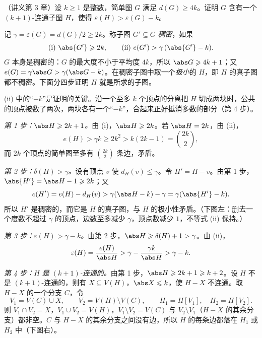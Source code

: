 \begin{workedexample}[问题 1]\label{we:yan-ch3-problems:mader}
（讲义第 3 章）设 $k\geqslant1$ 是整数，简单图 $G$ 满足 $d(G)\geqslant4k$。证明 $G$ 含有一个 $(k+1)$-连通子图 $H$，使得 $\varepsilon(H)>\varepsilon(G)-k$。
\end{workedexample}
\begin{solution}
记 $\gamma=\varepsilon(G)=d(G)/2\geqslant2k$。称子图 $G'\subseteq G$ \emph{稠密}，如果
\[
\text{(i)}\ \abs{G'}\geqslant2k,\qquad\text{(ii)}\ e(G')>\gamma\,(\abs{G'}-k).
\]
$G$ 本身是稠密的：$G$ 的最大度不小于平均度 $4k$，所以 $\abs G\geqslant4k+1$；又 $e(G)=\gamma\abs G>\gamma(\abs G-k)$。在稠密子图中取一个\emph{极小}的 $H$，即 $H$ 的真子图都不稠密。下面分四步证明 $H$ 就是所求的子图。

(ii) 中的“$-k$”是证明的关键。沿一个至多 $k$ 个顶点的分离把 $H$ 切成两块时，公共的顶点被数了两次，两块各有一个“$-k$”，合起来正好抵消多数的部分（第 4 步）。

\emph{第 1 步：$\abs H\geqslant2k+1$。}由 (i)，$\abs H\geqslant2k$。若 $\abs H=2k$，由 (ii)，
\[
e(H)>\gamma k\geqslant2k^2>k(2k-1)=\binom{2k}{2},
\]
而 $2k$ 个顶点的简单图至多有 $\binom{2k}2$ 条边，矛盾。

\emph{第 2 步：$\delta(H)>\gamma$。}设有顶点 $v$ 使 $d_H(v)\leqslant\gamma$。令 $H'=H-v$。由第 1 步，$\abs{H'}=\abs H-1\geqslant2k$；又
\[
e(H')=e(H)-d_H(v)>\gamma(\abs H-k)-\gamma=\gamma(\abs{H'}-k).
\]
所以 $H'$ 是稠密的，而它是 $H$ 的真子图，与 $H$ 的极小性矛盾。（下图左：删去一个度数不超过 $\gamma$ 的顶点，边数至多减少 $\gamma$，顶点数减少 $1$，不等式 (ii) 保持。）

\emph{第 3 步：$\varepsilon(H)>\gamma-k$。}由第 2 步，$\abs H\geqslant\delta(H)+1>\gamma$。由 (ii)，
\[
\varepsilon(H)=\frac{e(H)}{\abs H}>\gamma-\frac{\gamma k}{\abs H}>\gamma-k.
\]

\emph{第 4 步：$H$ 是 $(k+1)$-连通的。}由第 1 步，$\abs H\geqslant2k+1\geqslant k+2$。设 $H$ 不是 $(k+1)$-连通的，则有 $X\subseteq V(H)$，$\abs X\leqslant k$，使 $H-X$ 不连通。取 $H-X$ 的一个分支 $C$，令
\[
V_1=V(C)\cup X,\qquad V_2=V(H)\setminus V(C),\qquad H_1=H[V_1],\quad H_2=H[V_2].
\]
则 $V_1\cap V_2=X$，$V_1\cup V_2=V(H)$，$V_1\setminus V_2=V(C)$ 与 $V_2\setminus V_1$（$H-X$ 的其余分支）都非空。$C$ 与 $H-X$ 的其余分支之间没有边，所以 $H$ 的每条边都落在 $H_1$ 或 $H_2$ 中（下图右）。


\end{solution}
